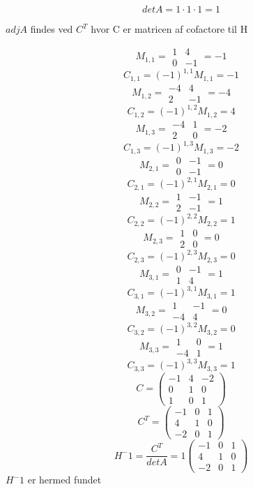\documentclass[12pt]{article}
\begin{document}
\begin{enumerate}[(a)]
\begin{enumerate}[(i)]
$$
detA=1\cdot 1\cdot 1 = 1
$$

$adjA$ findes ved $C^T$ hvor C er matricen af cofactore til H

$$
M_{1,1} = \begin{array}{|cc|}
1&4\\
0&-1
\end{array}= -1
$$$$C_{1,1} = (-1)^{1,1}M_{1,1} = -1
$$$$M_{1,2} = \begin{array}{|cc|}
-4&4\\
2&-1
\end{array}= -4 
$$$$C_{1,2} = (-1)^{1,2}M_{1,2} = 4
$$$$M_{1,3} = \begin{array}{|cc|}
-4&1\\
2&0
\end{array}= -2
$$$$C_{1,3} = (-1)^{1,3}M_{1,3} = -2
$$$$M_{2,1} = \begin{array}{|cc|}
0&-1\\
0&-1
\end{array}= 0
$$$$C_{2,1} = (-1)^{2,1}M_{2,1} = 0
$$$$M_{2,2} = \begin{array}{|cc|}
1&-1\\
2&-1
\end{array}= 1
$$$$C_{2,2} = (-1)^{2,2}M_{2,2} = 1
$$$$M_{2,3} = \begin{array}{|cc|}
1&0\\
2&0
\end{array}= 0
$$$$C_{2,3} = (-1)^{2,3}M_{2,3} = 0
$$$$M_{3,1} = \begin{array}{|cc|}
0&-1\\
1&4
\end{array}= 1
$$$$C_{3,1} = (-1)^{3,1}M_{3,1} = 1
$$$$M_{3,2} = \begin{array}{|cc|}
1&-1\\
-4&4
\end{array}= 0
$$$$C_{3,2} = (-1)^{3,2}M_{3,2} = 0
$$$$M_{3,3} = \begin{array}{|cc|}
1&0\\
-4&1
\end{array}= 1
$$$$C_{3,3} = (-1)^{3,3}M_{3,3} = 1
$$
$$
 C = \left(\begin{array}{ccc}
-1&4&-2\\
0&1&0\\
1&0&1
\end{array}\right)
$$$$
 C^T = \left(\begin{array}{ccc}
-1&0&1\\
4&1&0\\
-2&0&1
\end{array}\right)
$$
$$
H^-1=\frac{C^T}{detA}= 1 \left(\begin{array}{ccc}
-1&0&1\\
4&1&0\\
-2&0&1
\end{array}\right)
$$
$H^-1$ er hermed fundet


\end{enumerate}
\end{enumerate}
\end{document}
